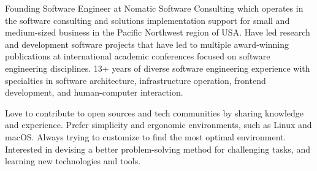 

\begin{cvparagraph}

Founding Software Engineer at Nomatic Software Consulting which operates in the software consulting and solutions implementation support for small and medium-sized business in the Pacific Northwest region of USA.
Have led research and development software projects that have led to multiple award-winning publications at international academic conferences focused on software engineering disciplines.
13+ years of diverse software engineering experience with specialties in software architecture, infrastructure operation, frontend development, and human-computer interaction.

Love to contribute to open sources and tech communities by sharing knowledge and experience. Prefer simplicity and ergonomic environments, such as Linux and macOS. Always trying to customize to find the most optimal environment. Interested in devising a better problem-solving method for challenging tasks, and learning new technologies and tools.
\end{cvparagraph}

